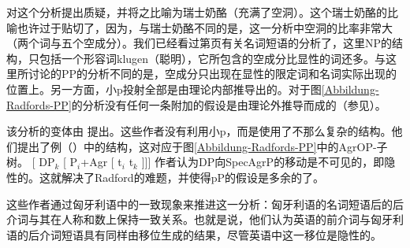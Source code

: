  \citet[--550]{Sternefeld2006a-u}对这个分析提出质疑，并将之比喻为瑞士奶酪（充满了空洞）。这个瑞士奶酪的比喻也许过于贴切了，因为，与瑞士奶酪不同的是，这一分析中空洞的比率非常大（两个词与五个空成分）。我们已经看过第\pageref{Abbildung-NP-ohne-Det}页有关名词短语的分析了，这里NP的结构，只包括一个形容词klugen（聪明），它所包含的空成分比显性的词还多。与这里所讨论的PP的分析不同的是，空成分只出现在显性的限定词和名词实际出现的位置上。另一方面，小p投射全部是由理论内部推导出的。对于图\ref{Abbildung-Radfords-PP}的分析没有任何一条附加的假设是由理论外推导而成的（参见\citealp[--550]{Sternefeld2006a-u}）。

该分析的变体由 \citet*[]{HNG2005a}提出。这些作者没有利用小p，而是使用了不那么复杂的结构。他们提出了例（）中的结构，这对应于图\ref{Abbildung-Radfords-PP}中的AgrOP-子树。
\ea
{}[ DP$_k$ [ P$_i$+Agr [ t$_i$ t$_k$ ]]]
\z
作者认为DP向SpecAgrP的移动是不可见的，即隐性的。这就解决了Radford的难题，并使得pP的假设是多余的了。

这些作者通过匈牙利语中的一致现象来推进这一分析：匈牙利语的名词短语后的后介词与其在人称和数上保持一致关系。也就是说，他们认为英语的前介词与匈牙利语的后介词短语具有同样由移位生成的结果，尽管英语中这一移位是隐性的。

